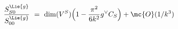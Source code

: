 \begin{equation}\label{expansionS}
\frac{S^{\Lie{g}}_{S0}}{S^{\Lie{g}}_{00}}\ =\ \dim
(V^{S})\Bigl(1-\frac{\pi^{2}}{6 k^{2}}g^{\vee }C_{S}
\Bigr) + \mc{O}( 1/k^{3})
\end{equation}

